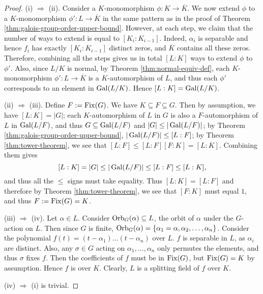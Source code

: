 \begin{proof}
	
	
	
	(i) $\Rightarrow$ (ii). Consider a $K$-monomorphism $\phi: K \to \overline{K}$. We now extend $\phi$ to a $K$-monomorphism $\phi':L \to \overline{K}$ in the same pattern as in the proof of Theorem \ref{thm:galois-group-order-upper-bound}. However, at each step, we claim that the number of ways to extend is equal to $[K_i : K_{i-1}]$. Indeed, $\alpha_i$ is separable and hence $f_i$ has exactly $[K_i : K_{i-1}]$ distinct zeros, and $\overline K$ contains all these zeros. Therefore, combining all the steps gives us in total $[L:K]$ ways to extend $\phi$ to $\phi'$. Also, since $L/K$ is normal, by Theorem \ref{thm:normal-equiv-def}, each $K$-monomorphism $\phi': L \to \overline{K}$ is a $K$-automorphism of $L$, and thus each $\phi'$ corresponds to an element in $\operatorname{Gal}(L/K)$. Hence $[L:K] = \operatorname{Gal}(L/K)$. 
	
	(ii) $\Rightarrow$ (iii). Define $F:= \operatorname{Fix}(G)$. We have $K \subseteq F \subseteq G$. Then by assumption, we have $[L:K] = |G|$; each $K$-automorphism of $L$ in $G$ is also a $F$-automorphism of $L$ in $\operatorname{Gal}(L/F)$, and thus $G \subseteq \operatorname{Gal}(L / F)$ and $|G| \le |\operatorname{Gal}(L / F)|$; by Theorem \ref{thm:galois-group-order-upper-bound}, $|\operatorname{Gal}(L/F)| \le [L:F]$; by Theorem \ref{thm:tower-theorem}, we see that $ [L:F] \le [L:F][F:K] = [L:K]$. Combining them gives $$
	[L:K] = |G| \le |\operatorname{Gal}(L/F)| \le  [L:F] \le [L:K],
	$$    
	and thus all the $\le$ signs must take equality.  
	Thus $[L:K]=[L:F]$ and therefore by Theorem \ref{thm:tower-theorem}, we see that $[F:K]$ must equal $1$, and thus $F:=\operatorname{Fix}(G) = K$.
	
	(iii) $\Rightarrow$ (iv). Let $\alpha \in L$. Consider $\operatorname{Orb}_G(\alpha) \subseteq L$, the orbit of $\alpha$ under the $G$-action on $L$. Then since $G$ is finite, $\operatorname{Orb}_G(\alpha) = \{ \alpha_1 = \alpha, \alpha_2, \ldots, \alpha_n\}$. Consider the polynomial $f(t) = (t-\alpha_1) \ldots (t-\alpha_n)$ over $L$.  $f$ is separable in $L$, as $\alpha_i$ are distinct. Also, any $\sigma \in G$ acting on $\alpha_1, \dots, \alpha_n$ only permutes the elements, and thus $\sigma$ fixes $f$. Then the coefficients of $f$ must be in $\operatorname{Fix}(G)$, but $\operatorname{Fix}(G) = K$ by assumption. Hence $f$ is over $K$. Clearly, $L$ is a splitting field of $f$ over $K$. 
	
	(iv) $\Rightarrow$ (i) is trivial.
	
\end{proof}

